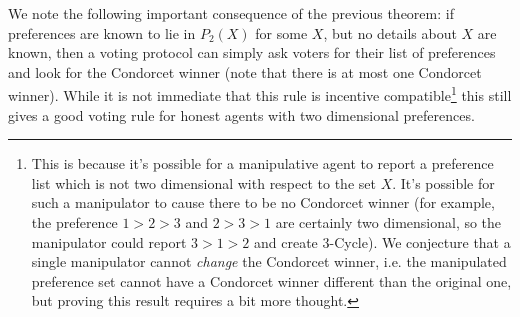 \documentclass[12pt]{article}
\newcommand{\1}[1]{\mathds{1}[{#1}]}
\begin{document}
  We note the following important consequence of the previous theorem:
  if preferences are known to lie in $P_2(X)$ for some $X$,
  but no details about $X$ are known, then a voting protocol can simply
  ask voters for their list of preferences and look for the Condorcet
  winner (note that there is at most one Condorcet winner).
  While it is not immediate that this rule is incentive compatible\footnote{
    This is because it's possible for a manipulative agent to report a
    preference list which is not two dimensional with respect to the set $X$.
    It's possible for such a manipulator to cause there to be no Condorcet
    winner (for example, the preference $1 > 2 > 3$ and $2 > 3 > 1$
    are certainly two dimensional, so the manipulator could report $3 > 1 > 2$
    and create $3$-{\sc Cycle}).
    We conjecture that a single manipulator cannot \emph{change} the Condorcet
    winner, i.e. the manipulated preference set cannot have a Condorcet winner
    different than the original one, but proving this result requires a bit more
    thought.
  } this still gives a good voting rule for honest agents with two dimensional
  preferences.

  {}
  
\end{document}
